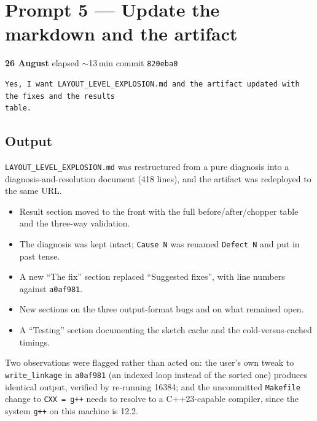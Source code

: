 \documentclass[11pt,a4paper]{article}
\newenvironment{promptbox}{\medskip}{\medskip}
\newcommand{\code}[1]{\lstinline[basicstyle=\ttfamily\small]!#1!}
\newcommand{\sha}[1]{\texttt{#1}}
\begin{document}
\section{Prompt 5 --- Update the markdown and the artifact}
\textbf{26 August} \textperiodcentered{} elapsed ${\sim}$13\,min \textperiodcentered{} commit \sha{820eba0}
\begin{promptbox}
\begin{lstlisting}[style=promptstyle]
Yes, I want LAYOUT_LEVEL_EXPLOSION.md and the artifact updated with the fixes and the results
table.
\end{lstlisting}
\end{promptbox}
\subsection*{Output}

\texttt{LAYOUT\_LEVEL\_EXPLOSION.md} was restructured from a pure diagnosis into a
diagnosis-and-resolution document (418 lines), and the artifact was redeployed to the same URL.

\begin{itemize}[leftmargin=*]
\item Result section moved to the front with the full before/after/chopper table and the
three-way validation.
\item The diagnosis was kept intact; \texttt{Cause N} was renamed \texttt{Defect N} and put in
past tense.
\item A new ``The fix'' section replaced ``Suggested fixes'', with line numbers against
\sha{a0af981}.
\item New sections on the three output-format bugs and on what remained open.
\item A ``Testing'' section documenting the sketch cache and the cold-versus-cached timings.
\end{itemize}

\noindent Two observations were flagged rather than acted on: the user's own tweak to
\code{write_linkage} in \sha{a0af981} (an indexed loop instead of the sorted one) produces identical
output, verified by re-running 16384; and the uncommitted \texttt{Makefile} change to
\texttt{CXX = g++} needs to resolve to a C++23-capable compiler, since the system \texttt{g++} on
this machine is 12.2.
\end{document}
